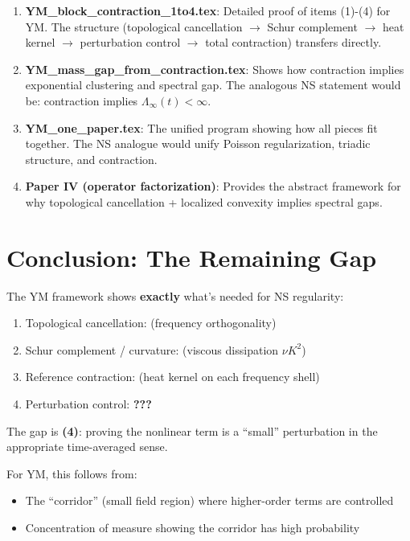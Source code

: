 \documentclass[11pt]{article}
\theoremstyle{definition}
\begin{document}
\begin{enumerate}
\item \textbf{YM\_block\_contraction\_1to4.tex}: Detailed proof of items (1)-(4) for YM. 
The structure (topological cancellation $\to$ Schur complement $\to$ heat kernel $\to$ 
perturbation control $\to$ total contraction) transfers directly.

\item \textbf{YM\_mass\_gap\_from\_contraction.tex}: Shows how contraction implies exponential 
clustering and spectral gap. The analogous NS statement would be: contraction implies 
$\Lambda_\infty(t) < \infty$.

\item \textbf{YM\_one\_paper.tex}: The unified program showing how all pieces fit together. 
The NS analogue would unify Poisson regularization, triadic structure, and contraction.

\item \textbf{Paper IV (operator factorization)}: Provides the abstract framework for why 
topological cancellation + localized convexity implies spectral gaps.
\end{enumerate}

\section{Conclusion: The Remaining Gap}

The YM framework shows \textbf{exactly} what's needed for NS regularity:
\begin{enumerate}
\item Topological cancellation: \checkmark (frequency orthogonality)
\item Schur complement / curvature: \checkmark (viscous dissipation $\nu K^2$)
\item Reference contraction: \checkmark (heat kernel on each frequency shell)
\item Perturbation control: \textbf{???}
\end{enumerate}

The gap is \textbf{(4)}: proving the nonlinear term is a ``small'' perturbation in the 
appropriate time-averaged sense.

For YM, this follows from:
\begin{itemize}
\item The ``corridor'' (small field region) where higher-order terms are controlled
\item Concentration of measure showing the corridor has high probability
\end{itemize}
\end{document}
